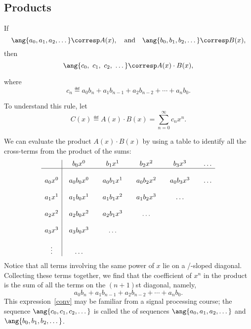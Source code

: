 \subsection{Products}

\begin{mathrule}
\label{rule:product}
If
%
\[
\ang{a_0, a_1, a_2, \dots} \corresp A(x),\quad \text{and}\quad
\ang{b_0, b_1, b_2, \dots} \corresp B(x),
\]
%
then
%
\[
\ang{c_0,\ c_1 ,\ c_2,\ \dots} \corresp A(x) \cdot B(x),
\]
\end{mathrule}
where
\[
c_n \eqdef a_0 b_n + a_1 b_{n-1} + a_2 b_{n-2} + \cdots + a_n b_0.
\]

To understand this rule, let
\[
C(x) \eqdef A(x) \cdot B(x) = \sum_{n=0}^{\infty} c_n x^n.
\]

We can evaluate the product $A(x) \cdot B(x)$ by using a table to identify
all the cross-terms from the product of the sums:
%
\[
\begin{array}{c|@{\quad}c@{\qquad}c@{\qquad}c@{\qquad}c@{\qquad}c}
        & b_0 x^0 & b_1 x^1 & b_2 x^2 & b_3 x^3 & \dots \\
\hline
\\
a_0 x^0 & a_0 b_0 x^0 & a_0 b_1 x^1 & a_0 b_2 x^2 & a_0 b_3 x^3 & \dots \\
\\
a_1 x^1 & a_1 b_0 x^1 & a_1 b_1 x^2 & a_1 b_2 x^3 & \dots \\
\\
a_2 x^2 & a_2 b_0 x^2 & a_2 b_1 x^3 & \dots \\
\\
a_3 x^3 & a_3 b_0 x^3 & \dots \\
\\
\vdots & \dots\\
\end{array}
\]
%
Notice that all terms involving the same power of $x$ lie on a
/-sloped diagonal.  Collecting these terms together, we find that the
coefficient of $x^n$ in the product is the sum of all the terms on the
$(n+1)$st diagonal, namely,
\begin{equation}\label{conv}
a_0 b_n + a_1 b_{n-1} + a_2 b_{n-2} + \cdots + a_n b_0.
\end{equation}
This expression~\eqref{conv} may be familiar from a signal processing
course; the sequence $\ang{c_0, c_1, c_2, \dots}$ is called the
 of sequences $\ang{a_0, a_1, a_2, \dots}$ and
$\ang{b_0, b_1, b_2, \dots}$.


